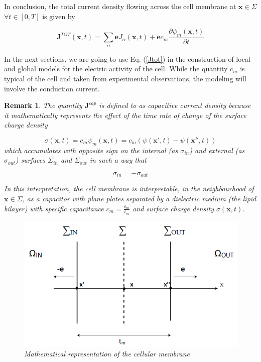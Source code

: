 \documentclass[12pt, a4paper]{report}
\newtheorem{remark}{Remark}
\begin{document}
In conclusion, the total current density flowing across the cell membrane at $ \textbf{x} \in \Sigma$ $\forall t \in [0,T]$ is given by

\begin{equation}
\textbf{J}^{TOT}(\textbf{x},t) = \sum_{\alpha} \textbf{e} J_{\alpha}(\textbf{x},t) + \textbf{e} c_m \frac{\partial \psi_m (\textbf{x},t)}{\partial t} \label{Jtot}
\end{equation}

In the next sections, we are going to use Eq. (\ref*{Jtot}) in the construction of local and global models for the electric activity of the cell. While the quantity $c_m$ is typical of the cell and taken from experimental observations, the modeling will involve the conduction current. 

\begin{remark}
	The quantity $\textbf{J}^{cap}$ is defined to as capacitive current density because it mathematically represents the effect of the time rate of change of the surface charge density 
	
	$$ \sigma(\textbf{x},t) = c_m \psi_m (\textbf{x},t) = c_m \left(\psi(\textbf{x}',t) - \psi(\textbf{x}'',t) \right)$$
	which accumulates with opposite sign on the internal (as $\sigma_{in}$) and external (as $\sigma_{out}$) surfaces $\Sigma_{in}$ and $\Sigma_{out}$ in such a way that
	
	$$ \sigma_{in} = -\sigma_{out} $$
	
	In this interpretation, the cell membrane is interpretable, in the neighbourhood of $ \textbf{x} \in \Sigma$, as a capacitor with plane plates separated by a dielectric medium (the lipid bilayer) with specific capacitance $ c_m = \frac{\varepsilon_m}{t_m}$ and surface charge density $\sigma(\textbf{x},t)$.
\end{remark}









\begin{figure}[H]	
	
		\centering
		\includegraphics[scale=0.65]{intra.png}
	
	\caption{\textit {Mathematical representation of the cellular membrane}}
	 
\end{figure}
\end{document}
